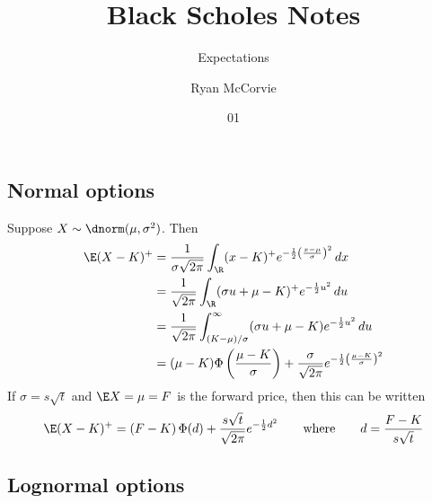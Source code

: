 \documentclass[english,seminar]{pnotes}
\title{Black Scholes Notes}
\subtitle{Expectations}
\author{Ryan McCorvie}
\date{01}{01}{2017}
\begin{document}
\subsection{Normal options}
Suppose $X\sim \dnorm(\mu,\sigma^2)$.  Then
\begin{equation}
\begin{split}
	\E (X-K)^{+} &= \frac 1 {\sigma \sqrt{2 \pi}} \int_{\R} (x-K)^{+} e^{-\frac 1 2 \left( \frac{x-\mu} \sigma \right)^2} \, dx \\
	&= \frac 1 { \sqrt{2 \pi}}\int_{\R} (\sigma u + \mu - K)^{+} e^{-\frac 1 2 u^2} \, du \\
	&= \frac 1 { \sqrt{2 \pi}}\int_{(K-\mu)/\sigma}^\infty (\sigma u + \mu - K) e^{-\frac 1 2 u^2} \, du \\
	&= (\mu-K) \Phi\left( \frac{ \mu-K} \sigma \right)  + \frac \sigma { \sqrt{2 \pi}} e^{- \frac 1 2 \left(\frac{\mu-K} \sigma \right)^2}
\end{split}
\end{equation}
If $\sigma = s\sqrt{t} $ and $\E X = \mu = F$ is the forward price, then this can be written
\begin{equation}
	\E(X-K)^+ = (F-K) \, \Phi( d  ) + \frac {s\sqrt{t}  }{ \sqrt{2 \pi}} e^{- \frac 1 2 d^2} \qquad \text{where} \qquad d = \frac{F-K}{s\sqrt{t} }
\end{equation}

\subsection{Lognormal options}
\end{document}
